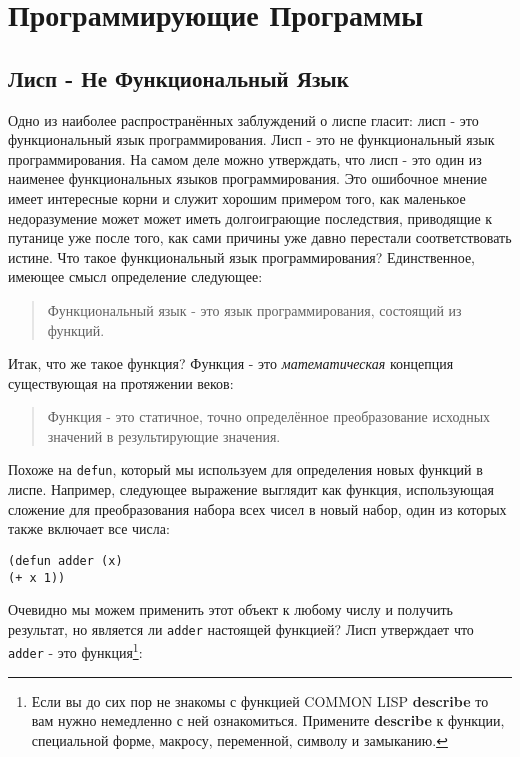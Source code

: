 \chapter{Программирующие Программы}\label{chapter_programs_that_program}
\section{Лисп - Не Функциональный Язык}\label{section_lisp_is_not_functional}

Одно из наиболее распространённых заблуждений о лиспе гласит: лисп - это функциональный язык программирования. Лисп - это не функциональный язык программирования. На самом деле можно утверждать, что лисп - это один из наименее функциональных языков программирования. Это ошибочное мнение имеет интересные корни и служит хорошим примером того, как маленькое недоразумение может может иметь долгоиграющие последствия, приводящие к путанице уже после того, как сами причины уже давно перестали соответствовать истине. Что такое функциональный язык программирования? Единственное, имеющее смысл определение следующее:

\begin{quote}
Функциональный язык - это язык программирования, состоящий из функций.
\end{quote}
 
Итак, что же такое функция? Функция - это \emph{математическая} концепция существующая на протяжении веков: 
 
\begin{quote}
Функция - это статичное, точно определённое преобразование исходных значений в результирующие значения. 
\end{quote}
 
Похоже на \verb"defun", который мы используем для определения новых функций в лиспе. Например, следующее выражение выглядит как функция, использующая сложение для преобразования набора всех чисел в новый набор, один из которых также включает все числа: 
 
\begin{verbatim}
(defun adder (x)
(+ x 1)) 
\end{verbatim}
 
Очевидно мы можем применить этот объект к любому числу и получить результат, но является ли \verb"adder" настоящей функцией? Лисп утверждает что \verb"adder" - это функция\footnote{Если вы до сих пор не знакомы с функцией COMMON LISP \textbf{describe} то вам нужно немедленно с ней ознакомиться. Примените \textbf{describe} к функции, специальной форме, макросу, переменной, символу и замыканию.}: 

